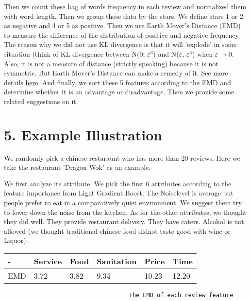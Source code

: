 \documentclass[11pt]{article}
\begin{document}
Then we count these bag of words frequency in each review and normalized
them with word length. Then we group these data by the stars. We define
stars 1 or 2 as negative and 4 or 5 as positive. Then we use Earth
Mover's Distance (EMD) to measure the difference of the distribution of
positive and negative frequency. The reason why we did not use KL
divergence is that it will 'explode' in some situation (think of KL
divergence between N(0, \(\varepsilon^3\)) and N(\(\varepsilon\),
\(\varepsilon^3\)) when \(\varepsilon\to 0\). Also, it is not a measure
of distance (strictly speaking) because it is not symmetric. But Earth
Mover's Distance can make a remedy of it. See more details
\href{https://vincentherrmann.github.io/blog/wasserstein/}{here}. And
finally, we sort these 5 features according to the EMD and determine
whether it is an advantage or disadvantage. Then we provide some related
suggestions on it. 

    \section{5. Example Illustration}\label{example-illustration}

    We randomly pick a chinese restaraunt who has more than 20 reviews. Here
we take the restaurant 'Dragon Wok' as an example.

We first analyze its attribute. We pick the first 6 attributes according
to the feature importance from Light Gradient Boost. The Noiselevel is
average but people prefer to eat in a comparatively quiet environment.
We suggest them try to lower down the noise from the kitchen. As for the
other attributes, we thought they did well. They provide restaurant
delivery. They have caters. Alcohol is not allowed (we thought
traditional chinese food didnot taste good with wine or Liquor).

\begin{longtable}[]{@{}llllll@{}}
\toprule
- & Service & Food & Sanitation & Price & Time\tabularnewline
\midrule
\endhead
EMD & 3.72 & 3.82 & 9.34 & 10.23 & 12.20\tabularnewline
\bottomrule
\end{longtable}

\begin{verbatim}
                                    The EMD of each review feature
\end{verbatim}
\end{document}
